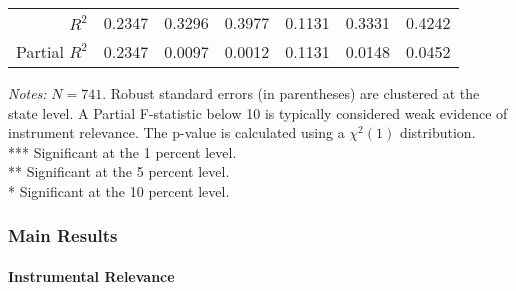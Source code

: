 \begin{frame}
\begin{table}[ht]
{\begin{tabular}{rcccccc}
                \cmidrule(lr){1-1} \cmidrule(lr){2-4} \cmidrule(lr){5-7} 
                $R^2$                                                         & 0.2347          & 0.3296          & 0.3977          & 0.1131         & 0.3331          & 0.4242          \\
                Partial $R^2$                                                 & 0.2347          & 0.0097          & 0.0012          & 0.1131         & 0.0148          & 0.0452          \\
                \bottomrule
            \end{tabular}
        }
        \vspace{0.2cm}
        
        \begin{minipage}{\linewidth}
            \tiny
            \textit{Notes:} $N = 741$. Robust standard errors (in parentheses) are clustered at the state level. A Partial F-statistic below 10 is typically considered weak evidence of instrument relevance. The p-value is calculated using a $\chi^2(1)$ distribution. \\
            *** Significant at the 1 percent level. \\
            ** Significant at the 5 percent level. \\
            * Significant at the 10 percent level.
        \end{minipage}
    \end{table}

\end{frame}
\begin{frame}
    \frametitle{Main Results}
    \framesubtitle{Instrumental Relevance}

    \lipsum[1]

\end{frame}
